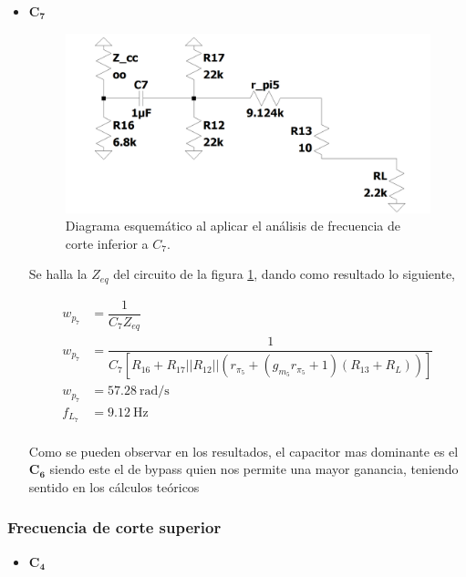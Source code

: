 \begin{enumerate}
\begin{itemize}
          \item $\mathbf{C_7}$

                \begin{figure}[H]
                  \centering
                  \includegraphics[width=12cm]{Imagenes/c7.png}
                  \caption{Diagrama esquemático al aplicar el análisis de frecuencia de corte inferior a $C_7$.}
                  \label{fig:c7}
                \end{figure}

                Se halla la $Z_{eq}$ del circuito de la figura \ref{fig:c7}, dando como resultado lo siguiente,

                \begin{align*}
                  w_{p_7} & =\dfrac{1}{C_7Z_{eq}}                                                                \\[0.2cm]
                  w_{p_7} & =\dfrac{1}{C_7[R_{16}+R_{17}||R_{12}||(r_{\pi_5}+(g_{m_5}r_{\pi_5}+1)(R_{13}+R_L))]} \\[0.2cm]
                  w_{p_7} & = \SI{57.28}{\radian\per\second}                                                     \\[0.2cm]
                  f_{L_7} & = \SI{9.12}{\hertz}                                                                  \\[0.2cm]
                \end{align*}

                Como se pueden observar en los resultados, el capacitor mas dominante es el $\mathbf{C_6}$ siendo este el de bypass quien nos permite una mayor ganancia, teniendo sentido en los cálculos teóricos
        \end{itemize}

        \subsubsection{Frecuencia de corte superior}
        \begin{itemize}
          \item $\mathbf{C_4}$


\end{itemize}
\end{enumerate}
